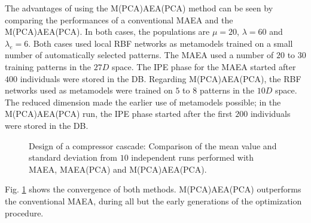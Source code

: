 The advantages of using the M(PCA)AEA(PCA) method can be seen by comparing the performances of a conventional MAEA and the M(PCA)AEA(PCA). In both cases, the populations are $\mu\!=\!20$, $\lambda\!=\!60$ and $\lambda_e\!=\!6$. Both cases used local RBF networks as metamodels trained on a small number of automatically selected patterns. The MAEA used a number of  $20$ to $30$ training patterns in the $27D$ space. The IPE phase for the MAEA started after $400$ individuals were stored in the DB. Regarding M(PCA)AEA(PCA), the RBF networks used as metamodels were trained on $5$ to $8$ patterns in the  $10D$ space. The reduced dimension made the earlier use of metamodels possible; in the M(PCA)AEA(PCA) run, the IPE phase started after the first $200$ individuals were stored in the DB. 


\begin{figure}[h!]
\begin{minipage}[b]{1\linewidth}
 \centering
\end{minipage}
\caption{Design of a compressor cascade:  Comparison of the mean value and standard deviation from  $10$ independent runs performed with MAEA, MAEA(PCA) and M(PCA)AEA(PCA).} 
\label{PCADrelaRes}
\end{figure}

Fig. \ref{PCADrelaRes} shows the convergence of both methods. M(PCA)AEA(PCA) outperforms the conventional MAEA, during all but the early generations of the optimization procedure. 

